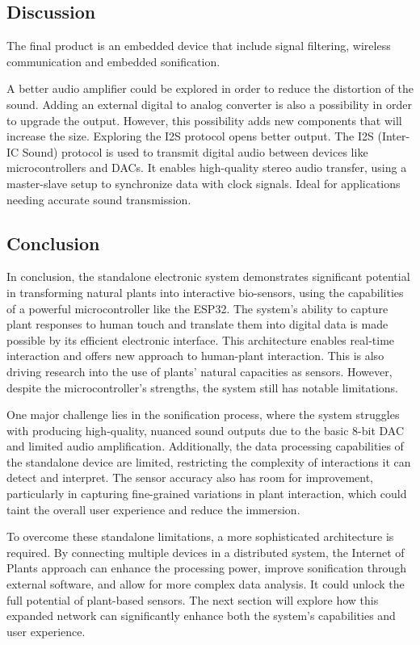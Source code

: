 \subsection{Discussion}

The final product is an embedded device that include signal filtering, wireless communication and embedded sonification.


A better audio amplifier could be explored in order to reduce the distortion of the sound.
Adding an external digital to analog converter is also a possibility in order to upgrade the output. However, this possibility adds new components that will increase the size. Exploring the I2S protocol opens better output.
The I2S (Inter-IC Sound) protocol is used to transmit digital audio between devices like microcontrollers and DACs. It enables high-quality stereo audio transfer, using a master-slave setup to synchronize data with clock signals. Ideal for applications needing accurate sound transmission.


\subsection{Conclusion}

In conclusion, the standalone electronic system demonstrates significant potential in transforming natural plants into interactive bio-sensors, using the capabilities of a powerful microcontroller like the ESP32. The system's ability to capture plant responses to human touch and translate them into digital data is made possible by its efficient electronic interface. This architecture enables real-time interaction and offers new approach to human-plant interaction. This is also driving research into the use of plants' natural capacities as sensors. However, despite the microcontroller's strengths, the system still has notable limitations.

One major challenge lies in the sonification process, where the system struggles with producing high-quality, nuanced sound outputs due to the basic 8-bit DAC and limited audio amplification. Additionally, the data processing capabilities of the standalone device are limited, restricting the complexity of interactions it can detect and interpret. The sensor accuracy also has room for improvement, particularly in capturing fine-grained variations in plant interaction, which could taint the overall user experience and reduce the immersion.

To overcome these standalone limitations, a more sophisticated architecture is required. By connecting multiple devices in a distributed system, the Internet of Plants approach can enhance the processing power, improve sonification through external software, and allow for more complex data analysis. It could unlock the  full potential of plant-based sensors. The next section will explore how this expanded network can significantly enhance both the system's capabilities and user experience.